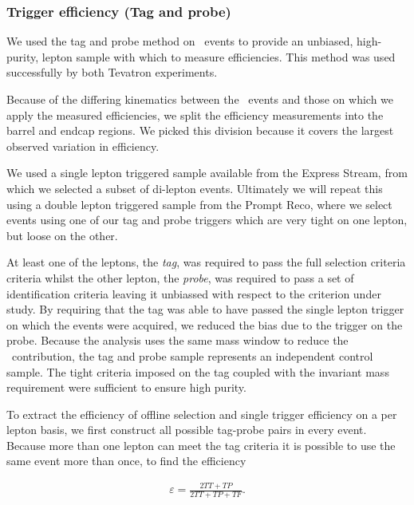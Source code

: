  

\subsubsection{Trigger efficiency (Tag and probe)}
 
We used the tag and probe method on \dyll~events to provide an unbiased, high-purity, 
lepton sample with which to measure efficiencies.
This method was used successfully by both Tevatron experiments.

Because of the differing kinematics between the \dyll~events and those on which we apply the measured efficiencies,
we split the efficiency measurements into the barrel and endcap regions.
We picked this division because it covers the largest observed variation in efficiency.

We used a single lepton triggered sample available from the Express Stream, 
from which we selected a subset of di-lepton events.
Ultimately we will repeat this using a double lepton triggered sample from the Prompt Reco,
where we select events using one of our tag and probe triggers which are very tight on one lepton,
but loose on the other.

At least one of the leptons, the {\it tag}, was required to pass the full selection criteria criteria 
whilst the other lepton, the {\it probe}, was required to pass a set of identification criteria leaving 
it unbiassed with respect to the criterion under study. 
By requiring that the tag was able to have passed the single lepton trigger on which the events were acquired, 
we reduced the bias due to the trigger on the probe.
Because the analysis uses the same mass window to reduce the \dyll~contribution, 
the tag and probe sample represents an independent control sample.
The tight criteria imposed on the tag coupled with the invariant mass requirement were sufficient to ensure high purity.

To extract the efficiency of offline selection and single trigger efficiency on a per lepton basis, 
we first construct all possible tag-probe pairs in every event.
Because more than one lepton can meet the tag criteria it is possible to use the same event more than once, to find the efficiency

\begin{eqnarray}
\label{eqn:tagAndProbeEfficiencyEqn}
\varepsilon = \frac{2TT + TP}{2TT + TP + TF}.
\end{eqnarray}

